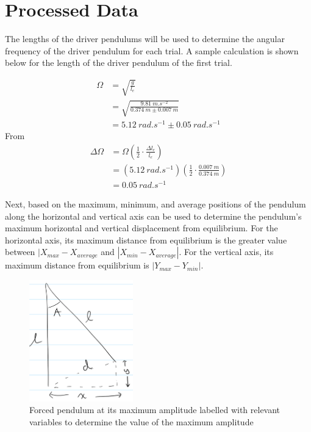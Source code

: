 \documentclass[letterpaper, 12pt]{article}
\begin{document}
\section{Processed Data}

The lengths of the driver pendulums will be used to determine
the angular frequency of the driver pendulum for each trial.
A sample calculation is shown below for the length of the
driver pendulum of the first trial.

\begin{paracol}{2}
    \begin{align*}
        \Omega & = \sqrt{\frac{g}{l_e}}
        \\
               & = \sqrt{\frac{\SI{9.81}{m.s^{-2}}}{\SI{0.374}{m} \pm \SI{0.007}{m}}}
        \\
               & = \SI{5.12}{rad.s^{-1}} \pm \SI{0.05}{rad.s^{-1}}
    \end{align*}
    \switchcolumn
    From \cite{gonzalesMeasurementUncertaintySquares2022}
    \begin{align*}
        \Delta \Omega & = \Omega \left( \frac{1}{2} \cdot \frac{\Delta l_e}{l_e} \right)
        \\
                      & = (\SI{5.12}{rad.s^{-1}})\left( \frac{1}{2} \cdot \frac{\SI{0.007}{m}}{\SI{0.374}{m}} \right)
        \\
                      & = \SI{0.05}{rad.s^{-1}}
    \end{align*}
\end{paracol}

Next, based on the maximum, minimum, and average
positions of the pendulum along the horizontal and
vertical axis can be used to determine
the pendulum's maximum horizontal and vertical
displacement from equilibrium.
For the horizontal axis, its maximum
distance from equilibrium is the greater
value between \(|X_{max} - X_{average}\)
and \(|X_{min} - X_{average}|\).
For the vertical axis, its
maximum distance from equilibrium is
\(|Y_{max} - Y_{min}|\).

\begin{figure}[H]
    \centering
    \includegraphics[width=0.4\textwidth]{determineAmplitude.png}
    \caption{Forced pendulum at its maximum amplitude labelled with relevant variables to determine the value of the maximum amplitude}
    \label{fig:determineAmplitude}
\end{figure}
\end{document}
